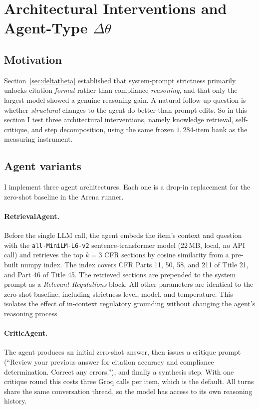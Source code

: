 \section{Architectural Interventions and Agent-Type \texorpdfstring{$\Delta\theta$}{Delta-theta}}
\label{sec:phase3b}

\subsection{Motivation}
Section~\ref{sec:deltatheta} established that system-prompt strictness
primarily unlocks citation \emph{format} rather than compliance
\emph{reasoning}, and that only the largest model showed a genuine
reasoning gain. A natural follow-up question is whether \emph{structural}
changes to the agent do better than prompt edits. So in this section I
test three architectural interventions, namely knowledge retrieval,
self-critique, and step decomposition, using the same frozen
$1{,}284$-item bank as the measuring instrument.

\subsection{Agent variants}
I implement three agent architectures. Each one is a drop-in replacement
for the zero-shot baseline in the Arena runner.

\paragraph{RetrievalAgent.}
Before the single LLM call, the agent embeds the item's context and
question with the \texttt{all-MiniLM-L6-v2} sentence-transformer model
(22\,MB, local, no API call) and retrieves the top $k = 3$ CFR sections
by cosine similarity from a pre-built numpy index. The index covers CFR
Parts 11, 50, 58, and 211 of Title 21, and Part 46 of Title 45. The
retrieved sections are prepended to the system prompt as a
\emph{Relevant Regulations} block. All other parameters are identical to
the zero-shot baseline, including strictness level, model, and
temperature. This isolates the effect of in-context regulatory grounding
without changing the agent's reasoning process.

\paragraph{CriticAgent.}
The agent produces an initial zero-shot answer, then issues a critique
prompt (``Review your previous answer for citation accuracy and
compliance determination. Correct any errors.''), and finally a synthesis
step. With one critique round this costs three Groq calls per item, which
is the default. All turns share the same conversation thread, so the
model has access to its own reasoning history.

